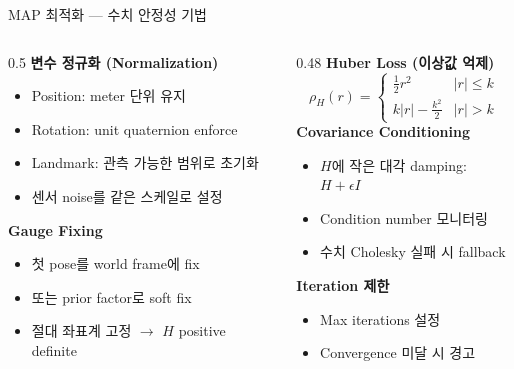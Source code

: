 \begin{frame}[shrink=10]{MAP 최적화 — 수치 안정성 기법}
  \begin{columns}[T]
    \begin{column}{0.5\textwidth}
      \textbf{변수 정규화 (Normalization)}
      \begin{itemize}
        \item Position: meter 단위 유지
        \item Rotation: unit quaternion enforce
        \item Landmark: 관측 가능한 범위로 초기화
        \item 센서 noise를 같은 스케일로 설정
      \end{itemize}
      \vspace{0.3em}
      \textbf{Gauge Fixing}
      \begin{itemize}
        \item 첫 pose를 world frame에 fix
        \item 또는 prior factor로 soft fix
        \item 절대 좌표계 고정 $\to$ $H$ positive definite
      \end{itemize}
    \end{column}
    \begin{column}{0.48\textwidth}
      \textbf{Huber Loss (이상값 억제)}
      \[
        \rho_H(r) = \begin{cases}
          \frac{1}{2}r^2 & |r| \le k \\
          k|r| - \frac{k^2}{2} & |r| > k
        \end{cases}
      \]
      \textbf{Covariance Conditioning}
      \begin{itemize}
        \item $H$에 작은 대각 damping: $H + \epsilon I$
        \item Condition number 모니터링
        \item 수치 Cholesky 실패 시 fallback
      \end{itemize}
      \vspace{0.3em}
      \textbf{Iteration 제한}
      \begin{itemize}
        \item Max iterations 설정
        \item Convergence 미달 시 경고
      \end{itemize}
    \end{column}
  \end{columns}
\end{frame}

